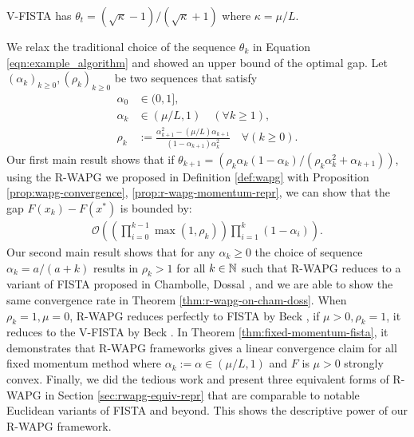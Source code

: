 \documentclass[12pt]{article}
\begin{document}
        V-FISTA has $\theta_t = (\sqrt{\kappa} - 1)/(\sqrt{\kappa} + 1)$ where $\kappa = \mu/L$. 
        \par
        We relax the traditional choice of the sequence $\theta_k$ in Equation \ref{eqn:example_algorithm} and showed an upper bound of the optimal gap. 
        Let $(\alpha_k)_{k \ge0}, (\rho_k)_{k \ge 0}$ be two sequences that satisfy
        \begin{align*}
            \alpha_0 &\in (0, 1], 
            \\
            \alpha_k &\in (\mu/L, 1) \quad (\forall k \ge 1), 
            \\
            \rho_k &:= \frac{\alpha_{k + 1}^2 - (\mu/L)\alpha_{k + 1}}{(1 - \alpha_{k + 1})\alpha_k^2} \quad \forall (k \ge 0). 
        \end{align*}
        Our first main result shows that if $\theta_{k + 1} = (\rho_k\alpha_k(1 - \alpha_k)/(\rho_k\alpha_k^2 + \alpha_{k + 1}))$, using the R-WAPG we proposed in Definition \ref{def:wapg} with Proposition \ref{prop:wapg-convergence}, \ref{prop:r-wapg-momentum-repr}, we can show that the gap $F(x_k) - F(x^*)$ is bounded by:
        \begin{align*}
            \mathcal O\left(
                \left(
                    \prod_{i = 0}^{k - 1} \max(1, \rho_{k})
                \right)
                \prod_{i = 1}^{k} \left(1  - \alpha_i\right)
            \right). 
        \end{align*}
        Our second main result shows that for any $\alpha_k \ge 0$ the choice of sequence $\alpha_k = a/(a + k)$ results in $\rho_k > 1$ for all $k \in \mathbb N$ such that R-WAPG reduces to a variant of FISTA proposed in Chambolle, Dossal \cite{chambolle_convergence_2015}, and we are able to show the same convergence rate in Theorem \ref{thm:r-wapg-on-cham-doss}. 
        When $\rho_k = 1, \mu = 0$, R-WAPG reduces perfectly to FISTA by Beck \cite{beck_first-order_2017}, if $\mu > 0, \rho_k = 1$, it reduces to the V-FISTA by Beck \cite{beck_first-order_2017}. 
        In Theorem \ref{thm:fixed-momentum-fista}, it demonstrates that R-WAPG frameworks gives a linear convergence claim for all fixed momentum method where $\alpha_k := \alpha \in (\mu/L, 1)$ and  $F$ is $\mu > 0$ strongly convex. 
        Finally, we did the tedious work and present three equivalent forms of R-WAPG in Section \ref{sec:rwapg-equiv-repr} that are comparable to notable Euclidean variants of FISTA and beyond. This shows the descriptive power of our R-WAPG framework. 
        \par
\end{document}
